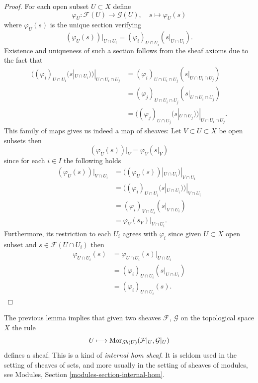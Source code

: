 \begin{proof}
For each open subset $U \subset X$ define
$$
\varphi_U : \mathcal{F}(U) \to \mathcal{G}(U), \quad
s \mapsto \varphi_U(s)
$$
where $\varphi_U(s)$ is the unique section verifying
$$
(\varphi_U(s))|_{U \cap U_i}
= (\varphi_i)_{U \cap U_i}(s|_{U \cap U_i}).
$$
Existence and uniqueness of such a section
follows from the sheaf axioms
due to the fact that
\begin{align*}
((\varphi_i)_{U \cap U_i}(s|_{U \cap U_i}))|_{U \cap U_i \cap U_j}
&= (\varphi_i)_{U \cap U_i \cap U_j}(s|_{U \cap U_i \cap U_j})\\
&= (\varphi_j)_{U \cap U_i \cap U_j}(s|_{U \cap U_i \cap U_j})\\
&= ((\varphi_j)_{U \cap U_j}(s|_{U \cap U_j}))|_{U \cap U_i \cap U_j}.
\end{align*}
This family of maps gives us indeed a map of sheaves:
Let $V \subset U \subset X$ be open subsets then
$$
(\varphi_U(s))|_V
= \varphi_V(s|_V)
$$
since for each $i \in I$ the following holds
\begin{align*}
(\varphi_U(s))|_{V \cap U_i}
&= ((\varphi_U(s))|_{U \cap U_i})|_{V \cap U_i}\\
&= ((\varphi_i)_{U \cap U_i}(s|_{U \cap U_i}))|_{V \cap U_i}\\
&= (\varphi_i)_{V \cap U_i}(s|_{V \cap U_i})\\
&= \varphi_V(s_{V})|_{V \cap U_i}.
\end{align*}
Furthermore,
its restriction to each $U_i$ agrees with $\varphi_i$
since given $U \subset X$ open subset
and $s \in \mathcal{F}(U \cap U_i)$ then
\begin{align*}
\varphi_{U \cap U_i}(s)
&= \varphi_{U \cap U_i}(s)|_{U \cap U_i}\\
&= (\varphi_i)_{U \cap U_i}(s|_{U \cap U_i})\\
&= (\varphi_i)_{U \cap U_i}(s).
\end{align*}
\end{proof}

\noindent
The previous lemma implies that given two sheaves $\mathcal{F}$,
$\mathcal{G}$ on the topological space $X$ the rule
$$
U \longmapsto
\mathop{\mathrm{Mor}}\nolimits_{\mathop{\mathit{Sh}}\nolimits(U)}(
\mathcal{F}|_U, \mathcal{G}|_U)
$$
defines a sheaf. This is a kind of {\it internal hom sheaf}. It is
seldom used in the setting of sheaves of sets, and more usually
in the setting of sheaves of modules, see
Modules, Section \ref{modules-section-internal-hom}.

